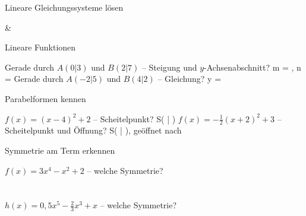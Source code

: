 \setcounter{aufgabe}{0}

\begin{aufgabe}{Lineare Gleichungssysteme lösen}
\begin{gleichungsraster}[2]
 &
 \\
\end{gleichungsraster}
\end{aufgabe}

\begin{aufgabe}{Lineare Funktionen}
\begin{teile}
\teil Gerade durch $A(0|3)$ und $B(2|7)$ – Steigung und $y$-Achsenabschnitt? m = \leerfeld , n = \leerfeld
\teil Gerade durch $A(-2|5)$ und $B(4|2)$ – Gleichung? y = \leerfeld
\end{teile}
\end{aufgabe}

\begin{aufgabe}{Parabelformen kennen}
\begin{teile}
\teil $f(x) = (x - 4)^2 + 2$ – Scheitelpunkt? S( \leerfeld | \leerfeld )
\teil $f(x) = -\frac{1}{2}(x + 2)^2 + 3$ – Scheitelpunkt und Öffnung? S( \leerfeld | \leerfeld ), geöffnet nach \leerfeld
\end{teile}
\end{aufgabe}

\begin{aufgabe}{Symmetrie am Term erkennen}
\begin{teile}
\teil $f(x) = 3x^4 - x^2 + 2$ – welche Symmetrie? \\  \\  \\ 
\teil $h(x) = 0{,}5x^5 - \frac{2}{3}x^3 + x$ – welche Symmetrie? \\  \\  \\ 
\end{teile}
\end{aufgabe}


